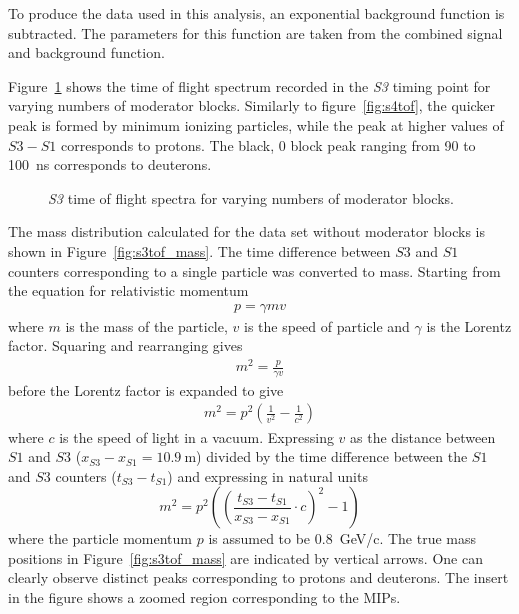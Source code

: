 To produce the data used in this analysis, an exponential background function is subtracted. 
The parameters for this function are taken from the combined signal and background function.

Figure~\ref{fig:s3tof} shows the time of flight spectrum recorded in the \textit{S3} timing point for varying numbers of moderator blocks.
Similarly to figure~\ref{fig:s4tof}, the quicker peak is formed by minimum ionizing particles, while the peak at higher values of $\mathit{S3} - \mathit{S1}$ corresponds to protons.
The black, 0 block peak ranging from 90 to 100~ns corresponds to deuterons.
\begin{figure}[h]
  \begin{adjustbox}{max totalsize={.8\textwidth}{.5\textheight},center}
    
  \end{adjustbox}
  \caption{\textit{S3} time of flight spectra for varying numbers of moderator blocks.}
  \label{fig:s3tof}
\end{figure}

The mass distribution calculated for the data set without moderator blocks is shown in Figure~\ref{fig:s3tof_mass}.
The time difference between $\mathit{S3}$ and $\mathit{S1}$ counters corresponding to a single particle was converted to mass.
Starting from the equation for relativistic momentum
\begin{align}
	p = \gamma m v
\end{align}
where $m$ is the mass of the particle, $v$ is the speed of particle and $\gamma$ is the Lorentz factor.
Squaring and rearranging gives
\begin{align}
	m^{2} = \frac{p}{\gamma v}
\end{align}
before the Lorentz factor is expanded to give
\begin{align}
	m^{2} = p^{2}\left(\frac{1}{v^{2}} - \frac{1}{c^{2}}\right)
\end{align}
where $c$ is the speed of light in a vacuum. Expressing $v$ as the distance between $\mathit{S1}$ and $\mathit{S3}$ ($x_{\mathit{S3}}-x_{\mathit{S1}} = 10.9~\text{m}$) divided by the time difference between the $\mathit{S1}$ and $\mathit{S3}$ counters ($t_{\mathit{S3}} - t_{\mathit{S1}}$) and expressing in natural units 
\begin{equation} 
  m^2 = p^2 \left( 
  \left(\frac{t_{\mathit{S3}}-t_{\mathit{S1}}}{x_{\mathit{S3}}-x_{\mathit{S1}}} \cdot c \right)^2
  - 1  \right)
\end{equation}
where the particle momentum $p$ is assumed to be 0.8~GeV/c.
The true mass positions in Figure~\ref{fig:s3tof_mass} are indicated by vertical arrows.
One can clearly observe distinct peaks corresponding to protons and deuterons. 
The insert in the figure shows a zoomed region corresponding to the MIPs. 


